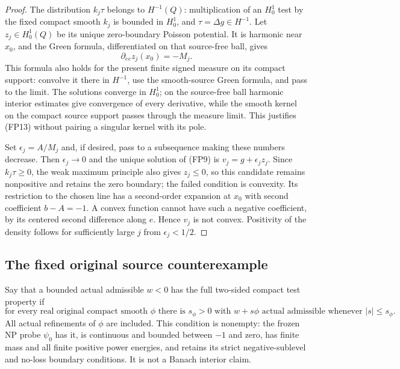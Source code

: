 \begin{proof}
The distribution $k_j\tau$ belongs to $H^{-1}(Q)$: multiplication
of an $H_0^1$ test by the fixed compact smooth $k_j$ is bounded in
$H_0^1$, and $\tau=\Delta g\in H^{-1}$. Let $z_j\in H_0^1(Q)$
be its unique zero-boundary Poisson potential. It is harmonic near
$x_0$, and the Green formula, differentiated on that source-free
ball, gives
\[
                  \partial_{ee}z_j(x_0)=-M_j.
 \tag{FP13}
\]
This formula also holds for the present finite signed measure
on its compact support: convolve it there in $H^{-1}$, use the
smooth-source Green formula, and pass to the limit. The solutions
converge in $H_0^1$; on the source-free ball harmonic interior
estimates give convergence of every derivative, while the smooth
kernel on the compact source support passes through the measure
limit. This justifies (FP13) without pairing a singular kernel
with its pole.

Set $\epsilon_j=A/M_j$ and, if desired, pass to a subsequence
making these numbers decrease. Then $\epsilon_j\to0$ and the
unique solution of (FP9) is $v_j=g+\epsilon_jz_j$. Since
$k_j\tau\ge0$, the weak maximum principle also gives
$z_j\le0$, so this candidate remains nonpositive and retains
the zero boundary; the failed condition is convexity.
Its restriction to the chosen line has a second-order expansion
at $x_0$ with second coefficient $b-A=-1$. A convex function
cannot have such a negative coefficient, by its centered second
difference along $e$. Hence $v_j$ is not convex. Positivity of the density follows
for sufficiently large $j$ from $\epsilon_j<1/2$.
\end{proof}

\subsection{The fixed original source counterexample}

Say that a bounded actual admissible $w<0$ has the full
two-sided compact test property if
\[
 \text{for every real original compact smooth }\phi
 \text{ there is }s_\phi>0\text{ with }
       w+s\phi\text{ actual admissible whenever }|s|\le s_\phi.
 \tag{FP14}
\]
All actual refinements of $\phi$ are included. This condition is
nonempty: the frozen NP probe $\psi_0$ has it, is continuous and
bounded between $-1$ and zero, has finite mass and all finite
positive power energies, and retains its strict negative-sublevel
and no-loss boundary conditions. It is not a Banach interior claim.

